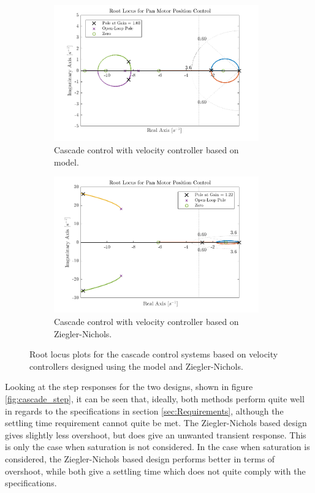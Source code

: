 \documentclass[../../main.tex]{subfiles}
\begin{document}
\begin{figure}[h]
\begin{subfigure}{0.48\textwidth}
    \includegraphics[width = 0.97\textwidth]{Sections/System_Design/Images/RL_cascadePP.png}
    \caption{Cascade control with velocity controller based on model.}
    \label{fig:RL_cascade_PP}
\end{subfigure}\quad
\begin{subfigure}{0.48\textwidth}
    \includegraphics[width = 0.97\textwidth]{Sections/System_Design/Images/RL_cascadeNZ.png}
    \caption{Cascade control with velocity controller based on Ziegler-Nichols.}
    \label{fig:RL_cascade_NZ}
\end{subfigure}
\caption{Root locus plots for the cascade control systems based on velocity controllers designed using the model and Ziegler-Nichols.}
\label{fig:RL_cascade}
\end{figure}

Looking at the step responses for the two designs, shown in figure \ref{fig:cascade_step}, it can be seen that, ideally, both methods perform quite well in regards to the specifications in section \ref{sec:Requirements}, although the settling time requirement cannot quite be met. The Ziegler-Nichols based design gives slightly less overshoot, but does give an unwanted transient response. This is only the case when saturation is not considered. In the case when saturation is considered, the Ziegler-Nichols based design performs better in terms of overshoot, while both give a settling time which does not quite comply with the specifications.
\end{document}
